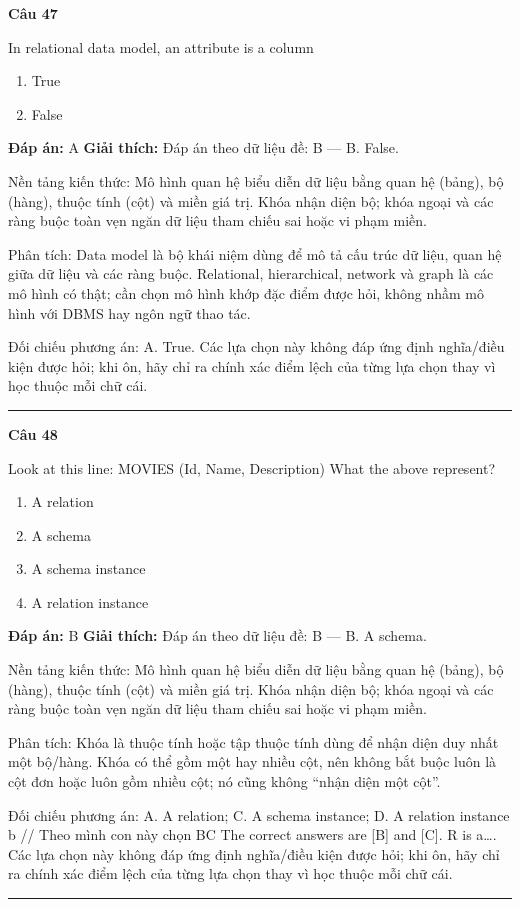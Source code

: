 \documentclass[11pt,a4paper]{article}
\newenvironment{question}[1]{%
  \par\vspace{1em}\noindent\textbf{\large Câu #1}\par\vspace{0.4em}
}{%
  \par\vspace{1em}\hrule\vspace{0.6em}
}
\newenvironment{choices}{%
  \begin{enumerate}[label=\textbf{\Alph*.},leftmargin=2.2em,itemsep=2pt,topsep=3pt]
}{%
  \end{enumerate}
}
\newcommand{\choice}{\item}
\begin{document}
\begin{question}{47}
In relational data model, an attribute is a column
\begin{choices}
\choice True
\choice False
\end{choices}
\textbf{Đáp án:} A
\textbf{Giải thích:} Đáp án theo dữ liệu đề: B — B. False.

Nền tảng kiến thức: Mô hình quan hệ biểu diễn dữ liệu bằng quan hệ (bảng), bộ (hàng), thuộc tính (cột) và miền giá trị. Khóa nhận diện bộ; khóa ngoại và các ràng buộc toàn vẹn ngăn dữ liệu tham chiếu sai hoặc vi phạm miền.

Phân tích: Data model là bộ khái niệm dùng để mô tả cấu trúc dữ liệu, quan hệ giữa dữ liệu và các ràng buộc. Relational, hierarchical, network và graph là các mô hình có thật; cần chọn mô hình khớp đặc điểm được hỏi, không nhầm mô hình với DBMS hay ngôn ngữ thao tác.

Đối chiếu phương án: A. True. Các lựa chọn này không đáp ứng định nghĩa/điều kiện được hỏi; khi ôn, hãy chỉ ra chính xác điểm lệch của từng lựa chọn thay vì học thuộc mỗi chữ cái.
\end{question}

\begin{question}{48}
Look at this line:
MOVIES (Id, Name, Description)
What the above represent?
\begin{choices}
\choice A relation
\choice A schema
\choice A schema instance
\choice A relation instance
\end{choices}
\textbf{Đáp án:} B
\textbf{Giải thích:} Đáp án theo dữ liệu đề: B — B. A schema.

Nền tảng kiến thức: Mô hình quan hệ biểu diễn dữ liệu bằng quan hệ (bảng), bộ (hàng), thuộc tính (cột) và miền giá trị. Khóa nhận diện bộ; khóa ngoại và các ràng buộc toàn vẹn ngăn dữ liệu tham chiếu sai hoặc vi phạm miền.

Phân tích: Khóa là thuộc tính hoặc tập thuộc tính dùng để nhận diện duy nhất một bộ/hàng. Khóa có thể gồm một hay nhiều cột, nên không bắt buộc luôn là cột đơn hoặc luôn gồm nhiều cột; nó cũng không “nhận diện một cột”.

Đối chiếu phương án: A. A relation; C. A schema instance; D. A relation instance b // Theo mình con này chọn BC The correct answers are [B] and [C]. R is a…. Các lựa chọn này không đáp ứng định nghĩa/điều kiện được hỏi; khi ôn, hãy chỉ ra chính xác điểm lệch của từng lựa chọn thay vì học thuộc mỗi chữ cái.
\end{question}
\end{document}
